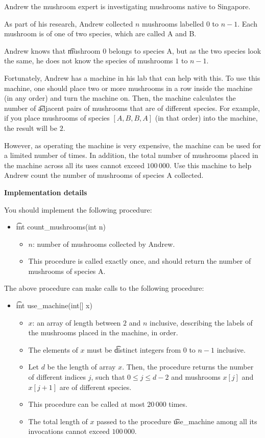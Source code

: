 Andrew the mushroom expert is investigating mushrooms native to Singapore.

As part of his research, Andrew collected $n$ mushrooms labelled $0$ to $n-1$. Each mushroom is of one of two species, which are called A and B.

Andrew knows that \t{mushroom $0$ belongs to species A}, but as the two species look the same, he does not know the species of mushrooms $1$ to $n-1$.

Fortunately, Andrew has a machine in his lab that can help with this. To use this machine, one should place two or more mushrooms in a row inside the machine (in any order) and turn the machine on. Then, the machine calculates the number of \t{adjacent} pairs of mushrooms that are of different species. For example, if you place mushrooms of species $[A, B, B, A]$ (in that order) into the machine, the result will be $2$.

However, as operating the machine is very expensive, the machine can be used for a limited number of times. In addition, the total number of mushrooms placed in the machine across all its uses cannot exceed $100\,000$. Use this machine to help Andrew count the number of mushrooms of species A
collected.

\textbf{Implementation details}

You should implement the following procedure:

\begin{itemize}
\item \t{int count\_mushrooms(int n)}
\begin{itemize}
\item $n$: number of mushrooms collected by Andrew.
\item This procedure is called exactly once, and should return the number of mushrooms of species A.
\end{itemize}
\end{itemize}

The above procedure can make calls to the following procedure:
\begin{itemize}
\item \t{int use\_machine(int[] x)}
\begin{itemize}
\item $x$: an array of length between $2$ and $n$ inclusive, describing the labels of the mushrooms
placed in the machine, in order.
\item The elements of $x$ must be \t{distinct} integers from $0$ to $n-1$ inclusive.
\item Let $d$ be the length of array $x$. Then, the procedure returns the number of different indices $j$, such that $0 \leq j \leq d-2$ and mushrooms $x[j]$ and $x[j+1]$ are of different species.
\item This procedure can be called at most $20\,000$ times.
\item The total length of $x$ passed to the procedure \t{use\_machine} among all its invocations cannot exceed $100\,000$.
\end{itemize}
\end{itemize}

